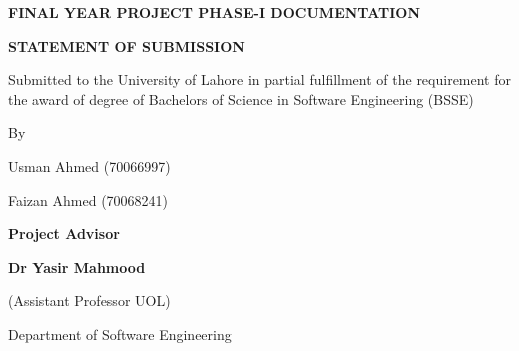 

\vspace{50mm}
\begin{center}

	
	\huge{\textbf{FINAL YEAR PROJECT PHASE-I DOCUMENTATION}} \\
	\vspace{10mm}

\end{center}

\vspace{20mm}

\begin{center}
	\huge{\textbf{STATEMENT OF SUBMISSION}} \\
	\vspace{10mm}

\end{center}


\vspace{20mm}


\begin{center}
	\Large{Submitted to the University of Lahore in partial fulfillment of the requirement for the award of degree of Bachelors of Science in Software Engineering (BSSE)} \\
	\vspace{10mm}

\end{center}
\vspace{10mm}
\Large

By
\vspace{10mm}

Usman Ahmed \hspace{5mm} (70066997) \hspace{5mm} \hrulefill

\vspace{5mm}

Faizan Ahmed \hspace{6mm} (70068241) \hspace{5mm} \hrulefill

\vspace{15mm}

\textbf{Project Advisor}
\hrulefill
\vspace{5mm}



\textbf{Dr Yasir Mahmood}
\vspace{5mm}


(Assistant Professor UOL)
\vspace{5mm}


Department of Software Engineering



\pagebreak